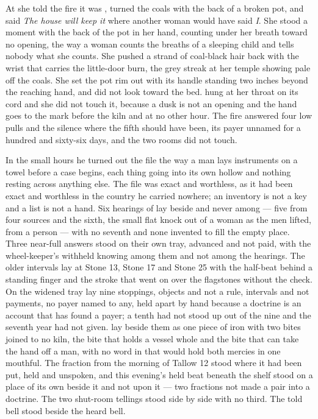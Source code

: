 At  she told the fire it was , turned the coals with the back of a broken pot, and said \emph{The house will keep it} where another woman would have said \emph{I}. She stood a moment with the back of the pot in her hand, counting under her breath toward no opening, the way a woman counts the breaths of a sleeping child and tells nobody what she counts. She pushed a strand of coal-black hair back with the wrist that carries the little-door burn, the grey streak at her temple showing pale off the coals. She set the pot rim out with its handle standing two inches beyond the reaching hand, and did not look toward the bed.  hung at her throat on its cord and she did not touch it, because a dusk is not an opening and the hand goes to the mark before the kiln and at no other hour. The fire answered four low pulls and the silence where the fifth should have been, its payer unnamed for a hundred and sixty-six days, and the two rooms did not touch.

In the small hours he turned out the file the way a man lays instruments on a towel before a case begins, each thing going into its own hollow and nothing resting across anything else. The file was exact and worthless, as it had been exact and worthless in the country he carried nowhere; an inventory is not a key and a list is not a hand. Six hearings of  lay beside and never among --- five from four sources and the sixth, the small flat knock out of a woman as the men lifted, from a person --- with no seventh and none invented to fill the empty place. Three near-full answers stood on their own tray, advanced and not paid, with the wheel-keeper's withheld knowing among them and not among the hearings. The older intervals lay at Stone 13, Stone 17 and Stone 25 with the half-beat behind a standing finger and the stroke that went on over the flagstones without the check. On the widened tray lay nine stoppings, objects and not a rule, intervals and not payments, no payer named to any, held apart by hand because a doctrine is an account that has found a payer; a tenth had not stood up out of the nine and the seventh year had not given.  lay beside them as one piece of iron with two bites joined to no kiln, the bite that holds a vessel whole and the bite that can take the hand off a man, with no word in  that would hold both mercies in one mouthful. The fraction from the morning of Tallow 12 stood where it had been put, held and unspoken, and this evening's held beat beneath the shelf stood on a place of its own beside it and not upon it --- two fractions not made a pair into a doctrine. The two shut-room tellings stood side by side with no third. The told bell stood beside the heard bell.

